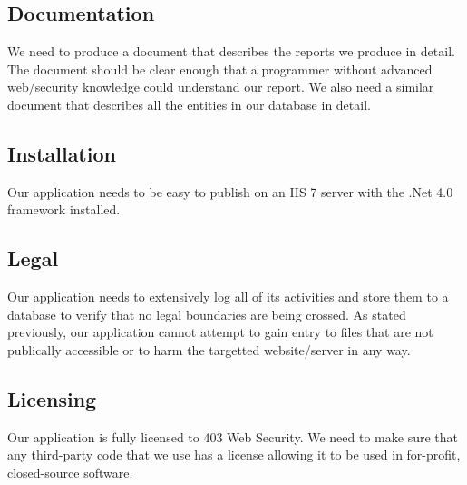 \subsection{Documentation}
We need to produce a document that describes the reports we produce in detail. The document should be clear enough that a programmer without advanced web/security knowledge could understand our report. We also need a similar document that describes all the entities in our database in detail. 
\subsection{Installation}
Our application needs to be easy to publish on an IIS 7 server with the .Net 4.0 framework installed.
\subsection{Legal}
Our application needs to extensively log all of its activities and store them to a database to verify that no legal boundaries are being crossed. As stated previously, our application cannot attempt to gain entry to files that are not publically accessible or to harm the targetted website/server in any way.
\subsection{Licensing}
Our application is fully licensed to 403 Web Security. We need to make sure that any third-party code that we use has a license allowing it to be used in for-profit, closed-source software.
